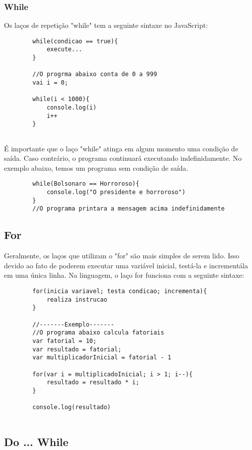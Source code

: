 	\subsubsection{While}
	Os laços de repetição "while" tem a seguinte sintaxe no JavaScript:
	\newline
	\begin{lstlisting}
		while(condicao == true){
			execute...
		}
		
		//O progrma abaixo conta de 0 a 999
		vai i = 0;
		
		while(i < 1000){
			console.log(i)
			i++
		}
		
	\end{lstlisting}
	É importante que o laço "while" atinga em algum momento uma condição de saída. Caso contrário, o programa continuará executando indefinidamente. No exemplo abaixo, temos um programa sem condição de saída.
	\newline
	\begin{lstlisting}
		while(Bolsonaro == Horroroso){
			console.log("O presidente e horroroso")
		}
		//O programa printara a mensagem acima indefinidamente
	\end{lstlisting}
	
	\subsection{For}
	
	Geralmente, os laços que utilizam o "for" são mais simples de serem lido. Isso devido ao fato de poderem executar uma variável inicial, testá-la e incrementála em uma única linha. Na linguagem, o laço for funciona com a seguinte sintaxe:
	\newline
	\begin{lstlisting}
		for(inicia variavel; testa condicao; incrementa){
			realiza instrucao
		}
	
	 	//-------Exemplo-------
	 	//O programa abaixo calcula fatoriais
	 	var fatorial = 10;
	 	var resultado = fatorial;
	 	var multiplicadorInicial = fatorial - 1
	 	
	 	for(var i = multiplicadoInicial; i > 1; i--){
	 		resultado = resultado * i;
	 	}
	 	
	 	console.log(resultado)
	 	
	\end{lstlisting}
	
	\subsection{Do ... While}
	
